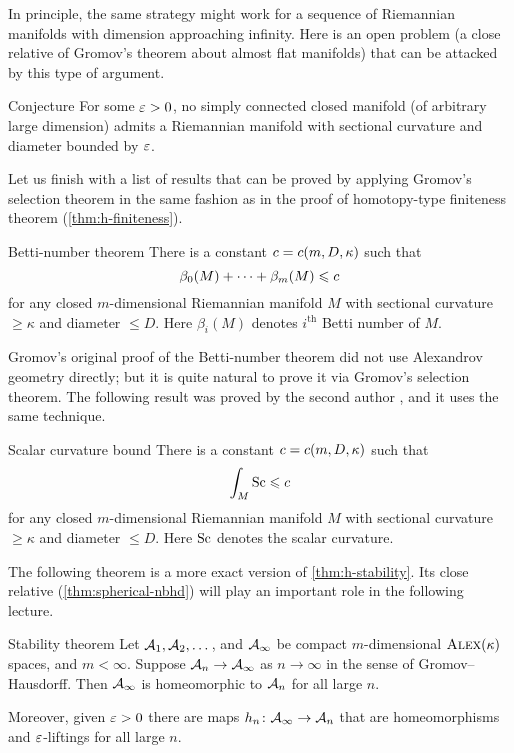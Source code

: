In principle, the same strategy might work for a sequence of Riemannian manifolds with dimension approaching infinity.
Here is an open problem (a close relative of Gromov's theorem about almost flat manifolds) that can be attacked by this type of argument.

\begin{thm}{Conjecture}
For some $\varepsilon>0$, no simply connected closed manifold (of arbitrary large dimension) admits a Riemannian manifold with sectional curvature and diameter bounded by $\varepsilon$.
\end{thm}

Let us finish with a list of results that can be proved by applying Gromov's selection theorem
in the same fashion as in the proof of homotopy-type finiteness theorem (\ref{thm:h-finiteness}).

\begin{thm}{Betti-number theorem}
There is a constant $c=c(m,D,\kappa)$ such that 
\[\beta_0(M)+\dots+\beta_m(M)\leqslant c\]
for any closed $m$-dimensional Riemannian manifold $M$ with sectional curvature $\ge \kappa$ and diameter $\le D$.
Here $\beta_i(M)$ denotes $i^\text{th}$ Betti number of $M$.
\end{thm}

Gromov's original proof \cite{gromov-1981} of the Betti-number theorem did not use Alexandrov geometry directly;
but it is quite natural to prove it via Gromov's selection theorem.
The following result was proved by the second author \cite{petrunin2008}, and it uses the same technique.

\begin{thm}{Scalar curvature bound}
There is a constant $c=c(m,D,\kappa)$ such that 
\[\int_M\mathrm{Sc}\leqslant c\]
for any closed $m$-dimensional Riemannian manifold $M$ with sectional curvature $\ge \kappa$ and diameter $\le D$.
Here $\mathrm{Sc}$ denotes the scalar curvature.
\end{thm}

The following theorem is a more exact version of \ref{thm:h-stability}.
Its close relative (\ref{thm:spherical-nbhd}) will play an important role in the following lecture.

\begin{thm}{Stability theorem}\label{thm:stability}
Let $\mathcal{A}_1,\mathcal{A}_2,\dots$, and $\mathcal{A}_\infty$ be compact $m$-dimensional $\textsc{Alex}(\kappa)$ spaces, and $m<\infty$.
Suppose $\mathcal{A}_n\to \mathcal{A}_\infty$ as $n\to \infty$ in the sense of Gromov--Hausdorff.
Then $\mathcal{A}_\infty$ is homeomorphic to $\mathcal{A}_n$ for all large $n$.

Moreover, given $\varepsilon>0$ there are maps $h_n\colon\mathcal{A}_\infty\to \mathcal{A}_n$ that are homeomorphisms and $\varepsilon$-liftings for all large $n$.
\end{thm}

